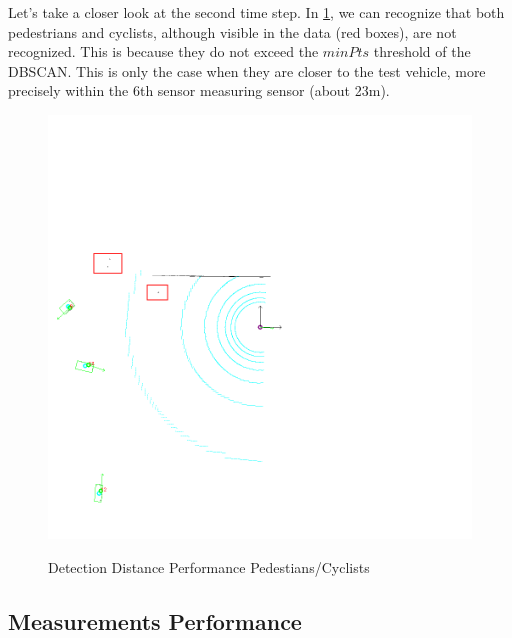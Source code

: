 \documentclass[11pt,oneside,openright]{mpreport}
\begin{document}
Let's take a closer look at the second time step. In \cref{detection_performance2}, we can recognize that both pedestrians and cyclists, although visible in the data (red boxes), are not recognized. 
This is because they do not exceed the $minPts$ threshold of the \ac{DBSCAN}. This is only the case when they are closer to the test vehicle, more precisely within the 6th sensor measuring sensor (about 23m).
\begin{figure}[!htb]
  \caption{Detection Distance Performance Pedestians/Cyclists} 
  \centering
  \includegraphics[width=\textwidth]{bilder/alg/img100002_m.png}
 \label{detection_performance2}
\end{figure}



\subsection{Measurements Performance}

\end{document}
